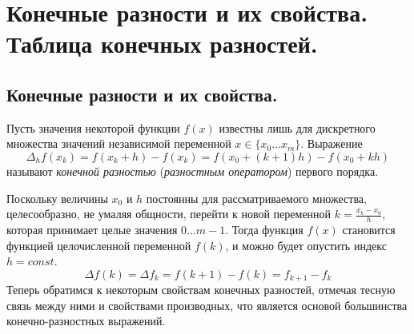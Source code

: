 \section{Конечные разности и их свойства. Таблица конечных разностей.}\label{sec:ch01}

\subsection{Конечные разности и их свойства.}
\begin{definition}
    Пусть значения некоторой функции $f(x)$ известны лишь для дискретного множества значений независимой переменной
    $x \in \{x_0\dots x_m\}$. Выражение
    \begin{equation}
        \Delta_h f\left(x_k\right) = f(x_k + h) - f(x_k) = f\left(x_0 + (k + 1)h\right) - f\left(x_0 + kh \right)
    \end{equation}
    называют \emph{конечной разностью} (\emph{разностным оператором}) первого порядка.
\end{definition}
Поскольку величины $x_0 \text{ и } h$ постоянны для рассматриваемого множества, целесообразно, не умаляя общности,
перейти к новой переменной $k = \frac{x_k - x_0}{h}$, которая принимает целые значения $0 \dots m-1$. Тогда функция $f(x)$
становится функцией целочисленной переменной $f(k)$, и можно будет опустить индекс $h = const$.
\begin{equation*}
    \Delta f(k) = \Delta f_k = f(k + 1) - f(k) = f_{k+1} - f_k
\end{equation*}
Теперь обратимся к некоторым свойствам конечных разностей, отмечая тесную связь между ними и свойствами производных, что
является основой большинства конечно-разностных выражений.
